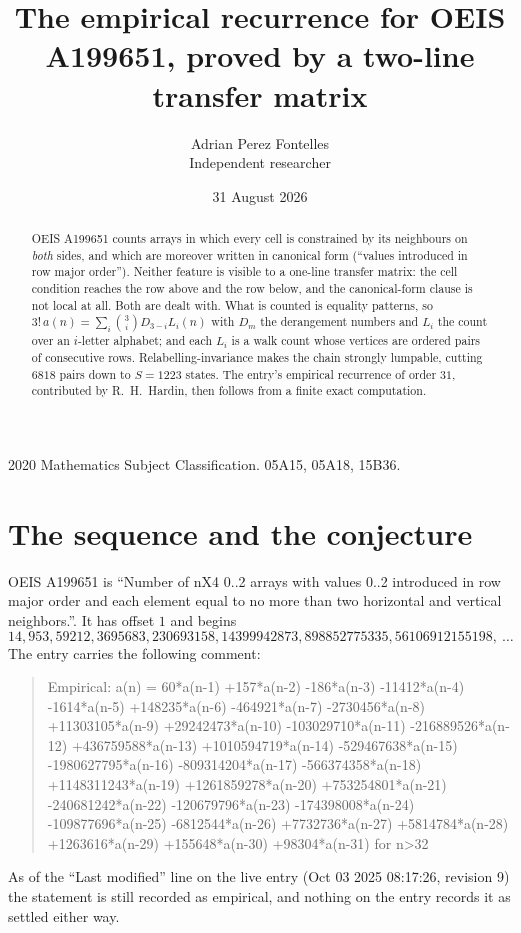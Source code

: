 \documentclass[11pt,a4paper]{article}
\title{The empirical recurrence for OEIS A199651, proved by a two-line transfer matrix}
\author{Adrian Perez Fontelles\\ \small Independent researcher}
\date{31 August 2026}
\theoremstyle{plain}
\theoremstyle{definition}
\begin{document}
\maketitle

\begin{abstract}
OEIS A199651 counts arrays in which every cell is constrained by its neighbours on \emph{both}
sides, and which are moreover written in canonical form (``values introduced in row major
order''). Neither feature is visible to a one-line transfer matrix: the cell condition
reaches the row above and the row below, and the canonical-form clause is not local at
all. Both are dealt with. What is counted is equality patterns, so
$3!\,a(n)=\sum_i\binom{3}{i}D_{3-i}L_i(n)$ with $D_m$ the derangement numbers and
$L_i$ the count over an $i$-letter alphabet; and each $L_i$ is a walk count whose vertices
are ordered pairs of consecutive rows. Relabelling-invariance makes the chain strongly
lumpable, cutting $6818$ pairs down to $S=1223$ states. The entry's empirical recurrence of
order $31$, contributed by R.~H.~Hardin, then follows from a finite exact computation.
\end{abstract}

\noindent\small 2020 Mathematics Subject Classification. 05A15, 05A18, 15B36.\normalsize

\section{The sequence and the conjecture}

OEIS A199651 is ``Number of nX4 0..2 arrays with values 0..2 introduced in row major order and each element equal to no more than two horizontal and vertical neighbors.''. It has offset $1$ and begins
\[
14, 953, 59212, 3695683, 230693158, 14399942873, 898852775335, 56106912155198,\ \dots
\]
The entry carries the following comment:
\begin{quote}\small
Empirical: a(n) = 60*a(n-1) +157*a(n-2) -186*a(n-3) -11412*a(n-4) -1614*a(n-5) +148235*a(n-6) -464921*a(n-7) -2730456*a(n-8) +11303105*a(n-9) +29242473*a(n-10) -103029710*a(n-11) -216889526*a(n-12) +436759588*a(n-13) +1010594719*a(n-14) -529467638*a(n-15) -1980627795*a(n-16) -809314204*a(n-17) -566374358*a(n-18) +1148311243*a(n-19) +1261859278*a(n-20) +753254801*a(n-21) -240681242*a(n-22) -120679796*a(n-23) -174398008*a(n-24) -109877696*a(n-25) -6812544*a(n-26) +7732736*a(n-27) +5814784*a(n-28) +1263616*a(n-29) +155648*a(n-30) +98304*a(n-31) for n>32
\end{quote}
As of the ``Last modified'' line on the live entry (Oct 03 2025 08:17:26, revision 9) the statement is
still recorded as empirical, and nothing on the entry records it as settled either way.
\end{document}

